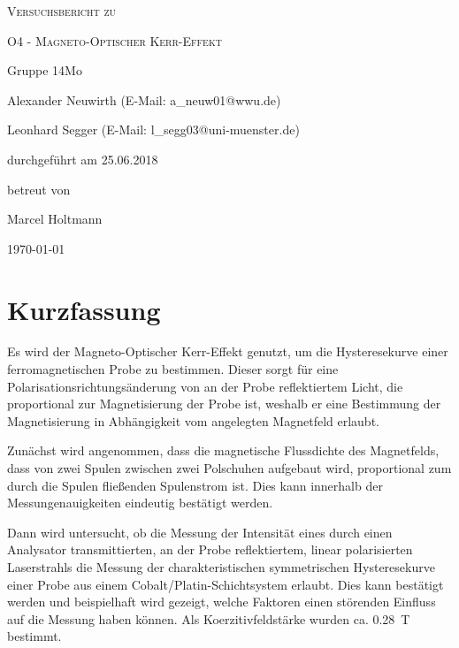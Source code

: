 \documentclass[
	a4paper,
	12pt,
	pagesize,
	ngerman
]{scrartcl}
\begin{document}
	
	\begin{titlepage}
		\centering
		{\scshape\LARGE Versuchsbericht zu \par}
		\vspace{1cm}
		{\scshape\huge O4 - Magneto-Optischer Kerr-Effekt \par}
		\vspace{2.5cm}
		{\LARGE Gruppe 14Mo \par}
		\vspace{0.5cm}
		
		{\large Alexander Neuwirth (E-Mail: a\_neuw01@wwu.de) \par}
		{\large Leonhard Segger (E-Mail: l\_segg03@uni-muenster.de) \par}
		\vfill
		
		durchgeführt am 25.06.2018\par
		betreut von\par
		{\large Marcel Holtmann}
		
		\vfill
		
		{\large \today\par}
	\end{titlepage}
	\tableofcontents
	\newpage

	\section{Kurzfassung}
	Es wird der Magneto-Optischer Kerr-Effekt genutzt, um die Hysteresekurve einer ferromagnetischen Probe zu bestimmen.
	Dieser sorgt für eine Polarisationsrichtungsänderung von an der Probe reflektiertem Licht, die proportional zur Magnetisierung der Probe ist, weshalb er eine Bestimmung der Magnetisierung in Abhängigkeit vom angelegten Magnetfeld erlaubt.
	
	Zunächst wird angenommen, dass die magnetische Flussdichte des Magnetfelds, dass von zwei Spulen zwischen zwei Polschuhen aufgebaut wird, proportional zum durch die Spulen fließenden Spulenstrom ist.
	Dies kann innerhalb der Messungenauigkeiten eindeutig bestätigt werden.
	
	Dann wird untersucht, ob die Messung der Intensität eines durch einen Analysator transmittierten, an der Probe reflektiertem, linear polarisierten Laserstrahls die Messung der charakteristischen symmetrischen Hysteresekurve einer Probe aus einem Cobalt/Platin-Schichtsystem erlaubt.
	Dies kann bestätigt werden und beispielhaft wird gezeigt, welche Faktoren einen störenden Einfluss auf die Messung haben können. 
	Als Koerzitivfeldstärke wurden ca. \SI{0,28}{\tesla} bestimmt.
	
\end{document}
